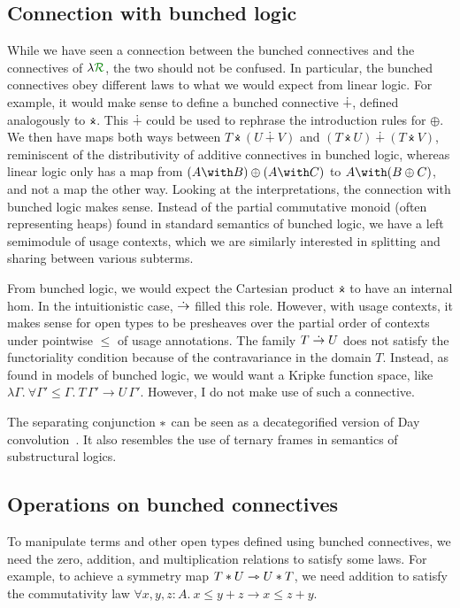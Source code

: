\subsection{Connection with bunched logic}\label{sec:bunched-logic}
While we have seen a connection between the bunched connectives and the
connectives of $\name$, the two should not be confused.
In particular, the bunched connectives obey different laws to what we would
expect from linear logic.
For example, it would make sense to define a bunched connective $\dotplus$,
defined analogously to $\dottimes$.
This $\dotplus$ could be used to rephrase the introduction rules for $\oplus$.
We then have maps both ways between $T \dottimes (U \dotplus V)$ and
$(T \dottimes U) \dotplus (T \dottimes V)$, reminiscent of the distributivity of
additive connectives in bunched logic,
whereas linear logic only has a map from $(A \with B) \oplus (A \with C)$ to
$A \with (B \oplus C)$, and not a map the other way.
Looking at the interpretations, the connection with bunched logic makes sense.
Instead of the partial commutative monoid (often representing heaps) found in
standard semantics of bunched logic, we have a left semimodule of usage
contexts, which we are similarly interested in splitting and sharing between
various subterms.

From bunched logic, we would expect the Cartesian product $\dottimes$ to have an
internal hom.
In the intuitionistic case, $\mathrel{\dot\to}$ filled this role.
However, with usage contexts, it makes sense for open types to be presheaves
over the partial order of contexts under pointwise $\leq$ of usage annotations.
The family $T \mathrel{\dot\to} U$ does not satisfy the functoriality condition because of
the contravariance in the domain $T$.
Instead, as found in models of bunched logic, we would want a Kripke function
space, like
$\lambda\Gamma.~\forall \Gamma' \leq \Gamma.~T\,\Gamma' \to U\,\Gamma'$.
However, I do not make use of such a connective.

The separating conjunction $\mathbin{*}$ can be seen as a decategorified version of Day
convolution~\citep{Day70}.
It also resembles the use of ternary frames  in semantics of
substructural logics.

\subsection{Operations on bunched connectives}\label{sec:bunched-op}
To manipulate terms and other open types defined using bunched connectives, we
need the zero, addition, and multiplication relations to satisfy some laws.
For example, to achieve a symmetry map $T \mathbin{*} U \rightarrowtriangle U \mathbin{*} T$,
we need addition to satisfy the commutativity law
$\forall x,y,z : A.~x \leq y + z \to x \leq z + y$.

